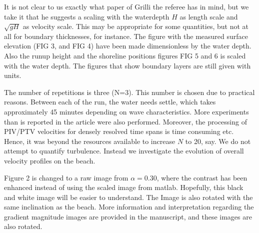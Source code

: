 
It is not clear to us exactly what paper of Grilli the referee has in mind, but we take it that he suggests a scaling
with the waterdepth $H$ as length scale and $\sqrt{gH}$ as velocity scale. This may be appropriate for some quantities, but not at all for boundary thicknesses, for instance.
The figure with the measured surface elevation (FIG 3, and  FIG 4) have been  made dimensionless  by the water depth. Also the runup height and the shoreline positions figures FIG 5 and 6 is scaled with the water depth. The figures that show boundary layers are still given with units. 

The number of repetitions is three (N=3). This number is chosen due to practical reasons. Between each of the run, the water needs settle, which takes approximately 45 minutes depending on wave characteristics. More experiments than is reported in the article were also performed. Moreover, the processing of PIV/PTV velocities for densely resolved time spans is time consuming etc. Hence, it was beyond the resources available to increase $N$ to 20, say.  
We do not attempt to quantify turbulence. Instead we investigate the evolution of overall velocity profiles on the beach.


Figure 2 is changed to a raw image from $\alpha=0.30$, where the contrast has been enhanced instead of using the scaled image from matlab. Hopefully, this black and white image will be easier to understand. The Image is also rotated with the same inclination as the beach. More information and interpretation regarding the gradient magnitude images are provided in the manuscript, and these images are also rotated.



